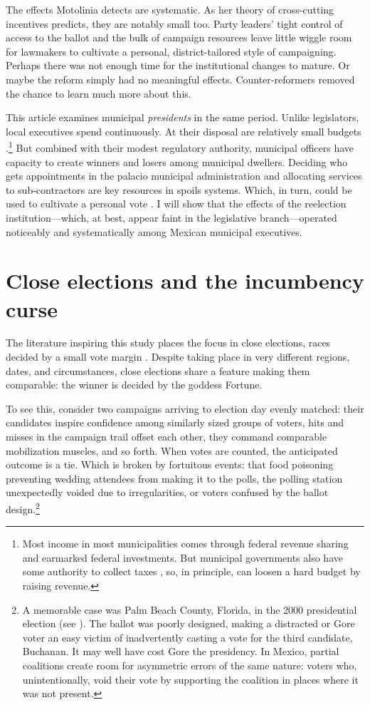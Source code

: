 \documentclass[letter,12pt]{article}
\begin{document}
The effects Motolinia detects are systematic. As her theory of cross-cutting incentives predicts, they are notably small too. Party leaders' tight control of access to the ballot and the bulk of campaign resources leave little wiggle room for lawmakers to cultivate a personal, district-tailored style of campaigning. Perhaps there was not enough time for the institutional changes to mature. Or maybe the reform simply had no meaningful effects. Counter-reformers removed the chance to learn much more about this.

This article examines municipal \emph{presidents} in the same period. Unlike legislators, local executives spend continuously. At their disposal are relatively small budgets \citep{diaz.cayeros.2006}.\footnote{Most income in most municipalities comes through federal revenue sharing and earmarked federal investments. But municipal governments also have some authority to collect taxes \citep{magar.el.dataset.2026}, so, in principle, can loosen a hard budget by raising revenue.} But combined with their modest regulatory authority, municipal officers have capacity to create winners and losers among municipal dwellers. Deciding who gets appointments in the palacio municipal administration and allocating services to sub-contractors are key resources in spoils systems. Which, in turn, could be used to cultivate a personal vote \citep{cain.etal.1987,carey.shugart.1995}. I will show that the effects of the reelection institution---which, at best, appear faint in the legislative branch---operated noticeably and systematically among Mexican municipal executives.

\section{Close elections and the incumbency curse}

The literature inspiring this study places the focus in close elections, races decided by a small vote margin \citep{mayhew1974vanishingMg,cox.1999}. Despite taking place in very different regions, dates, and circumstances, close elections share a feature making them comparable: the winner is decided by the goddess Fortune.

To see this, consider two campaigns arriving to election day evenly matched: their candidates inspire confidence among similarly sized groups of voters, hits and misses in the campaign trail offset each other, they command comparable mobilization muscles, and so forth. When votes are counted, the anticipated outcome is a tie. Which is broken by fortuitous events: that food poisoning preventing wedding attendees from making it to the polls, the polling station unexpectedly voided due to irregularities, or voters confused by the ballot design.\footnote{A memorable case was Palm Beach County, Florida, in the 2000 presidential election (see \citet{nyt-cohn-palmbeach.2024}). The ballot was poorly designed, making a distracted or Gore voter an easy victim of inadvertently casting a vote for the third candidate, Buchanan. It may well have cost Gore the presidency. In Mexico, partial coalitions create room for asymmetric errors of the same nature: voters who, unintentionally, void their vote by supporting the coalition in places where it was not present.}
\end{document}
